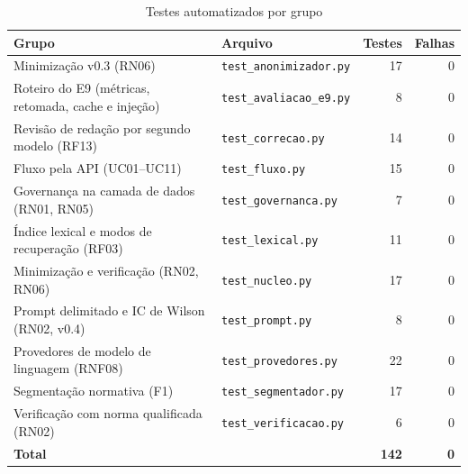 \begin{table}[htbp]
\caption{Testes automatizados por grupo}\label{tab:testes}
\centering\small
\setlength{\tabcolsep}{4pt}
\begin{tabular}{p{6.2cm}lrr}
\toprule
Grupo & Arquivo & Testes & Falhas \\
\midrule
Minimização v0.3 (RN06) & \texttt{test\_anonimizador.py} & 17 & 0 \\
Roteiro do E9 (métricas, retomada, cache e injeção) & \texttt{test\_avaliacao\_e9.py} & 8 & 0 \\
Revisão de redação por segundo modelo (RF13) & \texttt{test\_correcao.py} & 14 & 0 \\
Fluxo pela API (UC01–UC11) & \texttt{test\_fluxo.py} & 15 & 0 \\
Governança na camada de dados (RN01, RN05) & \texttt{test\_governanca.py} & 7 & 0 \\
Índice lexical e modos de recuperação (RF03) & \texttt{test\_lexical.py} & 11 & 0 \\
Minimização e verificação (RN02, RN06) & \texttt{test\_nucleo.py} & 17 & 0 \\
Prompt delimitado e IC de Wilson (RN02, v0.4) & \texttt{test\_prompt.py} & 8 & 0 \\
Provedores de modelo de linguagem (RNF08) & \texttt{test\_provedores.py} & 22 & 0 \\
Segmentação normativa (F1) & \texttt{test\_segmentador.py} & 17 & 0 \\
Verificação com norma qualificada (RN02) & \texttt{test\_verificacao.py} & 6 & 0 \\
\textbf{Total} &  & \textbf{142} & \textbf{0} \\
\bottomrule
\end{tabular}
\end{table}
